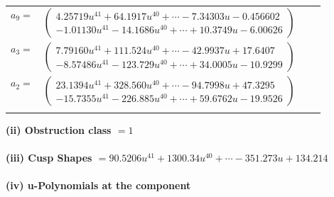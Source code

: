 \documentclass[1p]{elsarticle_modified}
\theoremstyle{definition}
\begin{document}
\begin{tabular}{m{7pt} m{180pt} m{7pt} m{180pt} }
\flushright $a_{9}=$&$\begin{pmatrix}4.25719 u^{41}+64.1917 u^{40}+\cdots-7.34303 u-0.456602\\-1.01130 u^{41}-14.1686 u^{40}+\cdots+10.3749 u-6.00626\end{pmatrix}$ \\
\flushright $a_{3}=$&$\begin{pmatrix}7.79160 u^{41}+111.524 u^{40}+\cdots-42.9937 u+17.6407\\-8.57486 u^{41}-123.729 u^{40}+\cdots+34.0005 u-10.9299\end{pmatrix}$ \\
\flushright $a_{2}=$&$\begin{pmatrix}23.1394 u^{41}+328.560 u^{40}+\cdots-94.7998 u+47.3295\\-15.7355 u^{41}-226.885 u^{40}+\cdots+59.6762 u-19.9526\end{pmatrix}$\\&\end{tabular}
\flushleft \textbf{(ii) Obstruction class $= 1$}\\~\\
\flushleft \textbf{(iii) Cusp Shapes $= 90.5206 u^{41}+1300.34 u^{40}+\cdots-351.273 u+134.214$}\\~\\
\newpage\renewcommand{\arraystretch}{1}
\flushleft \textbf{(iv) u-Polynomials at the component}\newline \\
\end{document}
